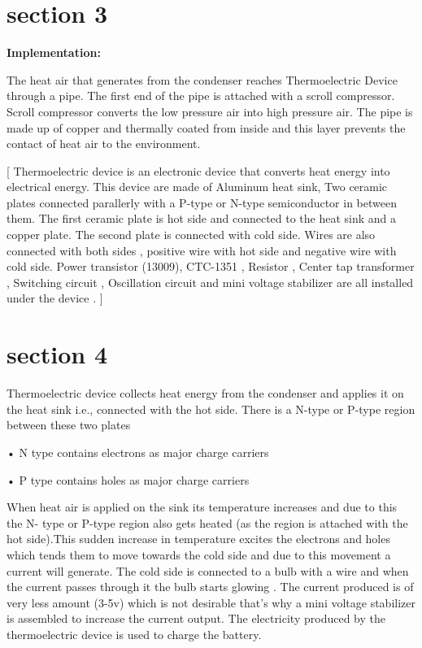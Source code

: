 \documentclass[12pt]{beamer}
\begin{document}
\section{section 3}
\begin{frame}
\textbf{Implementation:         }

         The heat air that generates from the condenser reaches 
Thermoelectric Device through a pipe. The first end of the pipe is attached with a scroll compressor. Scroll compressor converts the low pressure air into high pressure air. The pipe is made up of copper and thermally coated from inside and this layer prevents the contact of heat air to the environment. 


[   Thermoelectric device is an electronic device that converts heat energy into electrical energy. This device are made of Aluminum heat sink, Two ceramic plates connected parallerly with a P-type or N-type semiconductor in between them. The first ceramic plate is hot side and connected to the heat sink and a copper plate. The second plate is connected with cold side. Wires are also connected with both sides , positive wire with hot side and negative wire with cold side. 
Power transistor (13009), CTC-1351 , Resistor , Center tap transformer , 
Switching circuit , Oscillation circuit and mini voltage stabilizer are all installed under the device . ]
\end{frame}


\section{section 4}
\begin{frame}

Thermoelectric device collects heat energy from the condenser and applies it on the heat sink i.e., connected with the hot side. There is a N-type or P-type region between these two plates 

•	N type contains electrons as major charge carriers 

•	P type contains holes as major charge carriers 

When heat air is applied on the sink its temperature increases and due to this the N- type or P-type region also gets heated (as the region is attached with the hot side).This sudden increase in temperature excites the electrons and holes which tends them to move towards the cold side and due to this movement a current will generate. The cold side is connected to a bulb with a wire and when the current passes through it the bulb starts glowing . 
The current produced is of very less amount (3-5v) which is not desirable that’s why a mini voltage stabilizer is assembled to increase the current output. The electricity produced by the thermoelectric device is used to charge the battery.
\end{frame}
\end{document}
